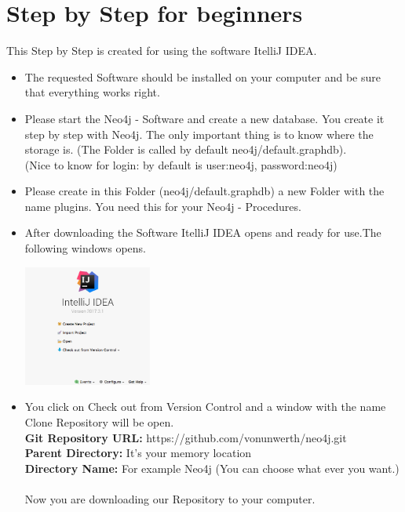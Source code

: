 \section{Step by Step for beginners}\label{sec:stepByStepManual}
This Step by Step is created for using the software \glqq ItelliJ IDEA\grqq{}.
\begin{itemize}
	\item The requested Software should be installed on your computer and be sure that everything works right.
	\item Please start the Neo4j - Software and create a new database. You create it step by step with Neo4j. The only important thing is to know where the storage is. (The Folder is called by default neo4j/default.graphdb). \\(Nice to know for login: by default is user:neo4j, password:neo4j)
	\item Please create in this Folder (neo4j/default.graphdb) a new Folder with the name \glqq plugins\grqq{}. You need this for your \glqq  Neo4j - Procedures\grqq{}.
	\newpage
	\item After downloading the Software \glqq ItelliJ IDEA\grqq{} opens and ready for use.The following windows opens. \\
	\begin{center}
		\includegraphics[width=4.2cm]{common/IntelliJstart.png}\setlength{\unitlength}{1mm}
	\end{center}

	\item You click on \glqq Check out from Version Control\grqq{} and a window with the name \glqq Clone Repository\grqq{} will be open. \\
	\textbf{Git Repository URL:} https://github.com/vonunwerth/neo4j.git \\
	\textbf{Parent Directory:} It's your memory location \\
	\textbf{Directory Name:} For example Neo4j (You can choose what ever you want.)\\
	\\
	Now you are downloading our Repository to your computer.
	

\end{itemize}

